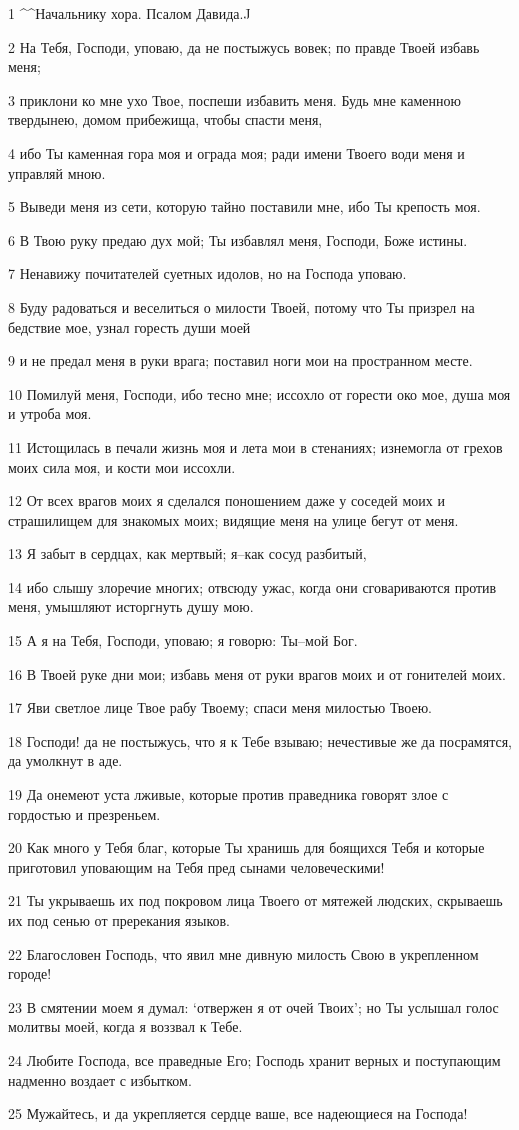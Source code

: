\par 1 ^^Начальнику хора. Псалом Давида.^^
\par 2 На Тебя, Господи, уповаю, да не постыжусь вовек; по правде Твоей избавь меня;
\par 3 приклони ко мне ухо Твое, поспеши избавить меня. Будь мне каменною твердынею, домом прибежища, чтобы спасти меня,
\par 4 ибо Ты каменная гора моя и ограда моя; ради имени Твоего води меня и управляй мною.
\par 5 Выведи меня из сети, которую тайно поставили мне, ибо Ты крепость моя.
\par 6 В Твою руку предаю дух мой; Ты избавлял меня, Господи, Боже истины.
\par 7 Ненавижу почитателей суетных идолов, но на Господа уповаю.
\par 8 Буду радоваться и веселиться о милости Твоей, потому что Ты призрел на бедствие мое, узнал горесть души моей
\par 9 и не предал меня в руки врага; поставил ноги мои на пространном месте.
\par 10 Помилуй меня, Господи, ибо тесно мне; иссохло от горести око мое, душа моя и утроба моя.
\par 11 Истощилась в печали жизнь моя и лета мои в стенаниях; изнемогла от грехов моих сила моя, и кости мои иссохли.
\par 12 От всех врагов моих я сделался поношением даже у соседей моих и страшилищем для знакомых моих; видящие меня на улице бегут от меня.
\par 13 Я забыт в сердцах, как мертвый; я--как сосуд разбитый,
\par 14 ибо слышу злоречие многих; отвсюду ужас, когда они сговариваются против меня, умышляют исторгнуть душу мою.
\par 15 А я на Тебя, Господи, уповаю; я говорю: Ты--мой Бог.
\par 16 В Твоей руке дни мои; избавь меня от руки врагов моих и от гонителей моих.
\par 17 Яви светлое лице Твое рабу Твоему; спаси меня милостью Твоею.
\par 18 Господи! да не постыжусь, что я к Тебе взываю; нечестивые же да посрамятся, да умолкнут в аде.
\par 19 Да онемеют уста лживые, которые против праведника говорят злое с гордостью и презреньем.
\par 20 Как много у Тебя благ, которые Ты хранишь для боящихся Тебя и которые приготовил уповающим на Тебя пред сынами человеческими!
\par 21 Ты укрываешь их под покровом лица Твоего от мятежей людских, скрываешь их под сенью от пререкания языков.
\par 22 Благословен Господь, что явил мне дивную милость Свою в укрепленном городе!
\par 23 В смятении моем я думал: `отвержен я от очей Твоих'; но Ты услышал голос молитвы моей, когда я воззвал к Тебе.
\par 24 Любите Господа, все праведные Его; Господь хранит верных и поступающим надменно воздает с избытком.
\par 25 Мужайтесь, и да укрепляется сердце ваше, все надеющиеся на Господа!

